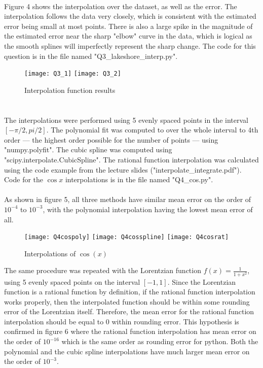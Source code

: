 \documentclass{article}
\newcommand{\<}[1]{\left\langle #1 \right\rangle }
\begin{document}
\\
Figure 4 shows the interpolation over the dataset, as well as the error. The interpolation follows the data very closely, which is consistent with the estimated error being small at most points. There is also a large spike in the magnitude of the estimated error near the sharp "elbow" curve in the data, which is logical as the smooth splines will imperfectly represent the sharp change. The code for this question is in the file named "Q3\_lakeshore\_interp.py".
\begin{figure}
	\caption{Interpolation function results}
	\texttt{[image: Q3\_1]}
	\texttt{[image: Q3\_2]}
\end{figure}

\section{}
The interpolations were performed using 5 evenly spaced points in the interval $[-\pi/2, pi/2]$. The polynomial fit was computed to over the whole interval to 4th order --- the highest order possible for the number of points --- using "numpy.polyfit". The cubic spline was computed using "scipy.interpolate.CubicSpline". The rational function interpolation was calculated using the code example from the lecture slides ("interpolate\_integrate.pdf"). Code for the $\cos{x}$ interpolations is in the file named "Q4\_cos.py".\\
\\
As shown in figure 5, all three methods have similar mean error on the order of $10^{-4}$ to $10^{-3}$, with the polynomial interpolation having the lowest mean error of all.
\begin{figure}[h]
	\caption{Interpolations of $\cos(x)$}
	\centering
	\texttt{[image: Q4cospoly]}
	\texttt{[image: Q4cosspline]}
	\texttt{[image: Q4cosrat]}
\end{figure}
The same procedure was repeated with the Lorentzian function $f(x) = \frac{1}{1+x^2}$, using 5 evenly spaced points on the interval $[-1, 1]$. Since the Lorentzian function is a rational function by definition, if the rational function interpolation works properly, then the interpolated function should be within some rounding error of the Lorentzian itself. Therefore, the mean error for the rational function interpolation should be equal to 0 within rounding error. This hypothesis is confirmed in figure 6 where the rational function interpolation has mean error on the order of $10^{-16}$ which is the same order as rounding error for python. Both the polynomial and the cubic spline interpolations have much larger mean error on the order of $10^{-3}$.
\end{document}

